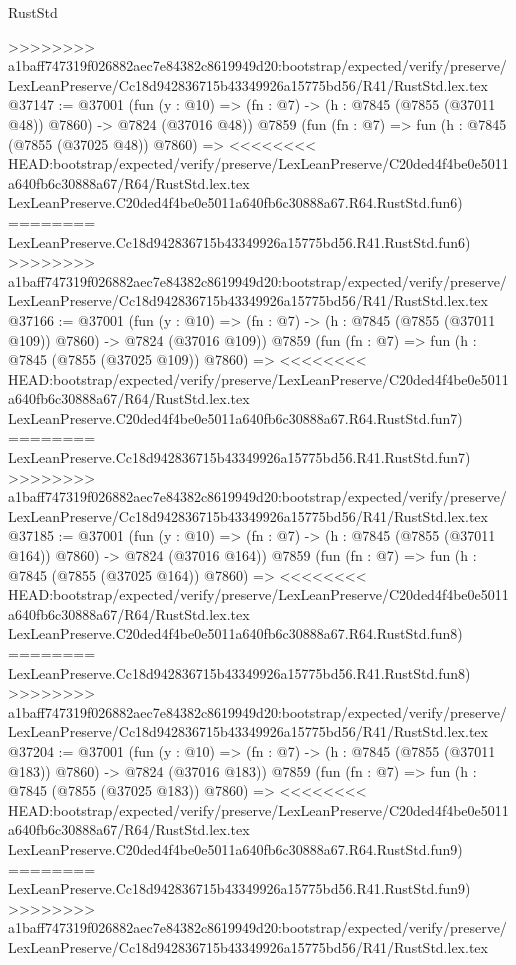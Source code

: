 \begin{lexlean}{RustStd}
\begin{coremodule}
{\begin{coremodule}
{{{{{{{{{{{{{{{{{{{{{{{{{{{{{{{{{{{{{{{{{{{{{{{{{{{{{{>>>>>>>> a1baff747319f026882aec7e84382c8619949d20:bootstrap/expected/verify/preserve/LexLeanPreserve/Cc18d942836715b43349926a15775bd56/R41/RustStd.lex.tex
@37147 := @37001
    (fun (y : @10) => (fn : @7) -> (h : @7845 (@7855 (@37011 @48)) @7860) -> @7824 (@37016 @48))
    @7859
    (fun (fn : @7) =>
    fun (h : @7845 (@7855 (@37025 @48)) @7860) =>
<<<<<<<< HEAD:bootstrap/expected/verify/preserve/LexLeanPreserve/C20ded4f4be0e5011a640fb6c30888a67/R64/RustStd.lex.tex
    LexLeanPreserve.C20ded4f4be0e5011a640fb6c30888a67.R64.RustStd.fun6)
========
    LexLeanPreserve.Cc18d942836715b43349926a15775bd56.R41.RustStd.fun6)
>>>>>>>> a1baff747319f026882aec7e84382c8619949d20:bootstrap/expected/verify/preserve/LexLeanPreserve/Cc18d942836715b43349926a15775bd56/R41/RustStd.lex.tex
@37166 := @37001
    (fun (y : @10) => (fn : @7) -> (h : @7845 (@7855 (@37011 @109)) @7860) -> @7824 (@37016 @109))
    @7859
    (fun (fn : @7) =>
    fun (h : @7845 (@7855 (@37025 @109)) @7860) =>
<<<<<<<< HEAD:bootstrap/expected/verify/preserve/LexLeanPreserve/C20ded4f4be0e5011a640fb6c30888a67/R64/RustStd.lex.tex
    LexLeanPreserve.C20ded4f4be0e5011a640fb6c30888a67.R64.RustStd.fun7)
========
    LexLeanPreserve.Cc18d942836715b43349926a15775bd56.R41.RustStd.fun7)
>>>>>>>> a1baff747319f026882aec7e84382c8619949d20:bootstrap/expected/verify/preserve/LexLeanPreserve/Cc18d942836715b43349926a15775bd56/R41/RustStd.lex.tex
@37185 := @37001
    (fun (y : @10) => (fn : @7) -> (h : @7845 (@7855 (@37011 @164)) @7860) -> @7824 (@37016 @164))
    @7859
    (fun (fn : @7) =>
    fun (h : @7845 (@7855 (@37025 @164)) @7860) =>
<<<<<<<< HEAD:bootstrap/expected/verify/preserve/LexLeanPreserve/C20ded4f4be0e5011a640fb6c30888a67/R64/RustStd.lex.tex
    LexLeanPreserve.C20ded4f4be0e5011a640fb6c30888a67.R64.RustStd.fun8)
========
    LexLeanPreserve.Cc18d942836715b43349926a15775bd56.R41.RustStd.fun8)
>>>>>>>> a1baff747319f026882aec7e84382c8619949d20:bootstrap/expected/verify/preserve/LexLeanPreserve/Cc18d942836715b43349926a15775bd56/R41/RustStd.lex.tex
@37204 := @37001
    (fun (y : @10) => (fn : @7) -> (h : @7845 (@7855 (@37011 @183)) @7860) -> @7824 (@37016 @183))
    @7859
    (fun (fn : @7) =>
    fun (h : @7845 (@7855 (@37025 @183)) @7860) =>
<<<<<<<< HEAD:bootstrap/expected/verify/preserve/LexLeanPreserve/C20ded4f4be0e5011a640fb6c30888a67/R64/RustStd.lex.tex
    LexLeanPreserve.C20ded4f4be0e5011a640fb6c30888a67.R64.RustStd.fun9)
========
    LexLeanPreserve.Cc18d942836715b43349926a15775bd56.R41.RustStd.fun9)
>>>>>>>> a1baff747319f026882aec7e84382c8619949d20:bootstrap/expected/verify/preserve/LexLeanPreserve/Cc18d942836715b43349926a15775bd56/R41/RustStd.lex.tex
}}}}}}}}}}}}}}}}}}}}}}}}}}}}}}}}}}}}}}}}}}}}}}}}}}}}}}
\end{coremodule}}
\end{coremodule}
\end{lexlean}
